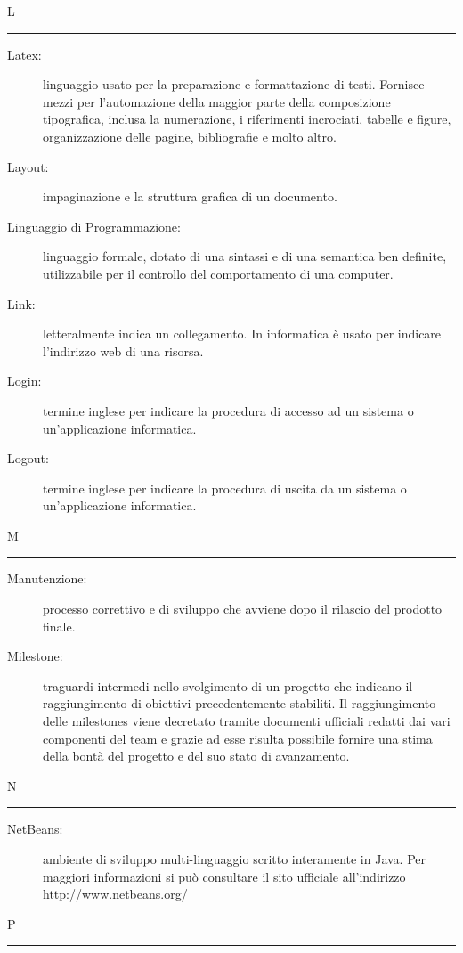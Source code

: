 \documentclass[11pt,a4paper]{article}
\begin{document}
\bigskip
\Huge L \bigskip
\hrule
\smallskip
\normalsize
\begin{description}
	\item[Latex:] linguaggio usato per la preparazione e formattazione di testi. Fornisce mezzi per l'automazione della maggior parte della composizione tipografica, inclusa la numerazione, i riferimenti incrociati, tabelle e figure, organizzazione delle pagine, bibliografie e molto altro.
	\item[Layout:] impaginazione e la struttura grafica di un documento.
	\item[Linguaggio di Programmazione:] linguaggio formale, dotato di una sintassi e di una semantica ben definite, utilizzabile per il controllo del comportamento di una computer.
	\item[Link:] letteralmente indica un collegamento. In informatica è usato per indicare l'indirizzo web di una risorsa.
	\item[Login:] termine inglese per indicare la procedura di accesso ad un sistema o un'applicazione informatica.
	\item[Logout:] termine inglese per indicare la procedura di uscita da un sistema o un'applicazione informatica.
\end{description}
\bigskip
\Huge M \bigskip
\hrule
\smallskip
\normalsize
\begin{description}
	\item[Manutenzione:] processo correttivo e di sviluppo che avviene dopo il rilascio del prodotto finale.
	\item[Milestone:] traguardi intermedi nello svolgimento di un progetto che indicano il raggiungimento di obiettivi precedentemente stabiliti. Il raggiungimento delle milestones viene decretato tramite documenti ufficiali redatti dai vari componenti del team e grazie ad esse risulta possibile fornire una stima della bontà del progetto e del suo stato di avanzamento.
\end{description}
\bigskip
\Huge N \bigskip
\hrule
\smallskip
\normalsize
\begin{description}
	\item[NetBeans:] ambiente di sviluppo multi-linguaggio scritto interamente in Java. Per maggiori informazioni si può consultare il sito ufficiale all'indirizzo http://www.netbeans.org/
\end{description}
\bigskip
\Huge P \bigskip
\hrule
\smallskip
\normalsize
\end{document}
